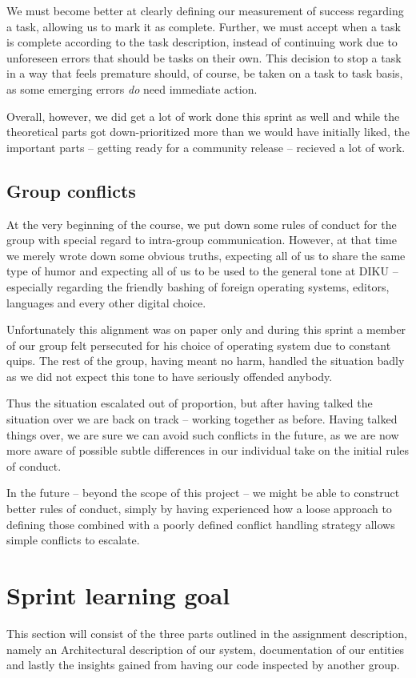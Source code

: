 \documentclass[a4paper]{article}
\begin{document}
We must become better at clearly defining our measurement of success regarding a
task, allowing us to mark it as complete. Further, we must accept when a task is
complete according to the task description, instead of continuing work due to
unforeseen errors that should be tasks on their own. This decision to stop a task
in a way that feels premature should, of course, be taken on a task to task
basis, as some emerging errors \textit{do} need immediate action.

Overall, however, we did get a lot of work done this sprint as well and while the
theoretical parts got down-prioritized more than we would have initially liked,
the important parts -- getting ready for a community release -- recieved a lot of
work.

\subsection{Group conflicts}
At the very beginning of the course, we put down some rules of conduct for the
group with special regard to intra-group communication. However, at that time
we merely wrote down some obvious truths, expecting all of us to share the same
type of humor and expecting all of us to be used to the general tone at DIKU --
especially regarding the friendly bashing of foreign operating systems, editors,
languages and every other digital choice.

Unfortunately this alignment was on paper only and during this sprint a member
of our group felt persecuted for his choice of operating system due to constant
quips. The rest of the group, having meant no harm, handled the situation badly
as we did not expect this tone to have seriously offended anybody.

Thus the situation escalated out of proportion, but after having talked the
situation over we are back on track -- working together as before. Having talked
things over, we are sure we can avoid such conflicts in the future, as we are
now more aware of possible subtle differences in our individual take on the
initial rules of conduct.

In the future -- beyond the scope of this project -- we might be able to construct
better rules of conduct, simply by having experienced how a loose approach to
defining those combined with a poorly defined
conflict handling strategy allows simple conflicts to escalate.

\section{Sprint learning goal}
\label{sec:learning_goals}
This section will consist of the three parts outlined in the assignment
description, namely an Architectural description of our system, documentation
of our entities and lastly the insights gained from having our code inspected
by another group.
\end{document}
